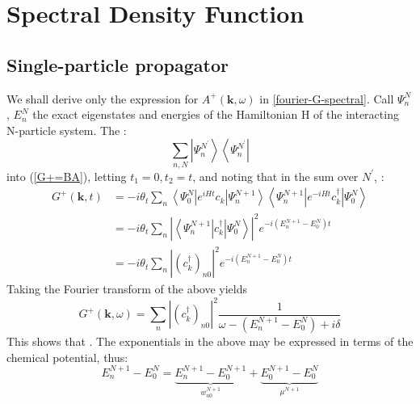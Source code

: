 \newpage
\section{Spectral Density Function}
\subsection{Single-particle propagator}
We shall derive only the expression for $A^{+}(\mathbf{k},\omega)$ in \ref{fourier-G-spectral}. Call $\Psi_n^{N}$, $E_n^{N}$ the exact eigenstates and energies of the Hamiltonian H of the interacting N-particle system. The :
$$\sum_{n, N}\left|\Psi_{n}^{N^{\prime}}\right\rangle\left\langle\Psi_{n}^{N^{\prime}}\right|$$
into (\ref{G+=BA}), letting $t_1=0,t_2=t$, and noting that in the sum over $N^{\prime}$, :
\begin{equation}\begin{aligned}
G^{+}(\mathbf{k}, t) &=-i \theta_{t} \sum_{n}\left\langle\Psi_{0}^{N}\left|e^{i H t} c_{k}\right| \Psi_{n}^{N+1}\right\rangle\left\langle\Psi_{n}^{N+1}\left|e^{-i H t} c_{k}^{\dagger}\right| \Psi_{0}^{N}\right\rangle \\
&=-i \theta_{t} \sum_{n}\left|\left\langle\Psi_{n}^{N+1}\left|c^{\dagger}_{k}\right| \Psi_{0}^{N}\right\rangle\right|^{2} e^{-i\left(E_{n}^{N+1}-E_{0}^{N}\right) t} \\
&=-i \theta_{t} \sum_{n}\left|\left(c_{k}^{\dagger}\right)_{n 0}\right|^{2} e^{-i\left(E_{n}^{N+1}-E_{0}^{N}\right) t}
\end{aligned}\end{equation}
Taking the Fourier transform of the above yields
\begin{equation}G^{+}(\mathbf{k}, \omega)=\sum_{n}\left|\left(c_{k}^{\dagger}\right)_{n 0}\right|^{2} \frac{1}{\omega-\left(E_{n}^{N+1}-E_{0}^{N}\right)+i \delta}\end{equation}
This shows that .
The exponentials in the above may be expressed in terms of the chemical potential, thus:
\begin{equation}E_{n}^{N+1}-E_{0}^{N}=\underbrace{E_{n}^{N+1}-E_{0}^{N+1}}_{w_{n 0}^{N+1}}+\underbrace{E_{0}^{N+1}-E_{0}^{N}}_{\mu^{N+1}}\end{equation}

